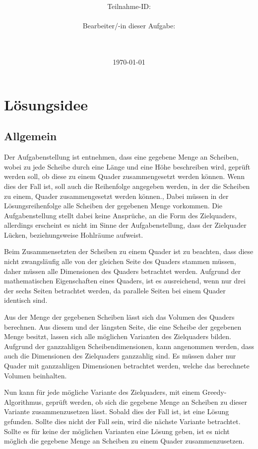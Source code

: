 \documentclass[a4paper,10pt,ngerman]{scrartcl}
\title{\textbf{\Huge\Aufgabe}}
\author{\LARGE Teilnahme-ID: \LARGE \TeilnahmeId \\\\
\LARGE Bearbeiter/-in dieser Aufgabe: \\
\LARGE \Name\\\\}
\date{\LARGE\today}
\begin{document}
    \maketitle
    \tableofcontents
    \vspace{0.5cm}

    \newpage


    \section{Lösungsidee}\label{sec:losungsidee}

    \subsection{Allgemein}\label{subsec:allgemein}

    Der Aufgabenstellung ist entnehmen, dass eine gegebene Menge an Scheiben, wobei zu jede Scheibe durch
    eine Länge und eine Höhe beschreiben wird, geprüft werden soll, ob diese zu einem Quader zusammengesetzt werden können.
    Wenn dies der Fall ist, soll auch die Reihenfolge angegeben werden, in der die Scheiben zu einem, Quader zusammengesetzt werden können.,
    Dabei müssen in der Lösungsreihenfolge alle Scheiben der gegebenen Menge vorkommen.
    Die Aufgabenstellung stellt dabei keine Ansprüche, an die Form des Zielquaders, allerdings erscheint es nicht im Sinne der Aufgabenstellung,
    dass der Zielquader Lücken, beziehungsweise Hohlräume aufweist.

    Beim Zusammensetzten der Scheiben zu einem Quader ist zu beachten, dass diese nicht zwangsläufig alle von der gleichen Seite des Quaders stammen müssen,
    daher müssen alle Dimensionen des Quaders betrachtet werden.
    Aufgrund der mathematischen Eigenschaften eines Quaders, ist es ausreichend, wenn nur drei der sechs Seiten betrachtet werden,
    da parallele Seiten bei einem Quader identisch sind.

    Aus der Menge der gegebenen Scheiben lässt sich das Volumen des Quaders berechnen.
    Aus diesem und der längsten Seite, die eine Scheibe der gegebenen Menge besitzt, lassen sich alle möglichen Varianten des Zielquaders bilden.
    Aufgrund der ganzzahligen Scheibendimensionen, kann angenommen werden, dass auch die Dimensionen des Zielquaders ganzzahlig sind.
    Es müssen daher nur Quader mit ganzzahligen Dimensionen betrachtet werden, welche das berechnete Volumen beinhalten.

    Nun kann für jede mögliche Variante des Zielquaders, mit einem Greedy-Algorithmus, geprüft werden,
    ob sich die gegebene Menge an Scheiben zu dieser Variante zusammenzusetzen lässt.
    Sobald dies der Fall ist, ist eine Lösung gefunden.
    Sollte dies nicht der Fall sein, wird die nächste Variante betrachtet.
    Sollte es für keine der möglichen Varianten eine Lösung geben, ist es nicht möglich die gegebene Menge an Scheiben
    zu einem Quader zusammenzusetzen.
\end{document}
